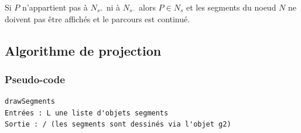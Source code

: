 \documentclass[11pt,a4paper]{article}
\begin{document}
Si $P$ n'appartient pas à $N_{s^+}$ ni à $N_{s^-}$ alors $P \in N_s$ et les segments du noeud $N$ ne doivent pas être affichés et le parcours est continué.

\subsection{Algorithme de projection}

\subsubsection{Pseudo-code}

\begin{lstlisting}
drawSegments
Entrées : L une liste d'objets segments
Sortie : / (les segments sont dessinés via l'objet g2)
\end{lstlisting}
\end{document}
